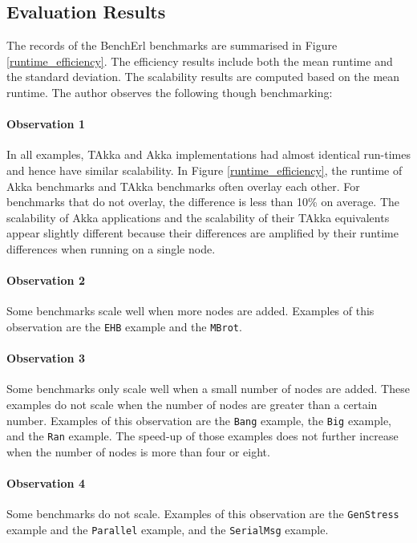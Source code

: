 \subsection{Evaluation Results}

The records of the BenchErl benchmarks are summarised in Figure 
\ref{runtime_efficiency}.  The efficiency results include both the mean 
runtime and the standard deviation.  The scalability results are computed based 
on the mean runtime.  The author observes the following though benchmarking:

\paragraph{Observation 1} In all examples, TAkka and Akka implementations had 
almost identical run-times and hence have similar scalability.  In Figure 
\ref{runtime_efficiency}, the runtime of Akka benchmarks and TAkka benchmarks 
often overlay each other.  For benchmarks that do not overlay, the 
difference is less than 10\% on average.  The scalability of Akka applications 
and the scalability of their TAkka equivalents appear slightly different 
because their differences are amplified by their runtime differences when 
running on a single node.

\paragraph{Observation 2} Some benchmarks scale well when more nodes are added. 
 Examples of this observation are the {\tt EHB} example and the {\tt MBrot}. 

\paragraph{Observation 3} Some benchmarks only scale well when a small number 
of nodes are added.  These examples do not scale when the number of nodes are 
greater than a certain number.  Examples of this observation are the {\tt Bang} 
example, the {\tt Big} example, and the {\tt Ran} example.  The speed-up of 
those examples does not further increase when the number of nodes is more than 
four or eight.  

\paragraph{Observation 4} Some benchmarks do not scale.  Examples of this 
observation are the {\tt GenStress} example and the {\tt Parallel} 
example, and the {\tt SerialMsg} example.




